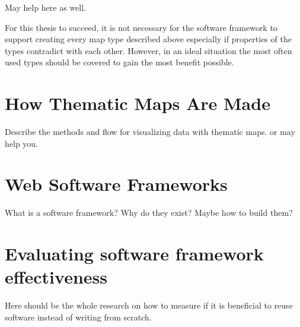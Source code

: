 \citet[p.~16]{tufte_visual_1986} May help here as well.

For this thesis to succeed, it is not necessary for the software framework to support creating every map type described above especially if properties of the types contradict with each other. However, in an ideal situation the most often used types should be covered to gain the most benefit possible. 


\section{How Thematic Maps Are Made}

Describe the methods and flow for visualizing data with thematic maps. \citet{schlichtmann_visualization_2002} or \citet[p.~5]{slocum_thematic_2014} may help you.

\section{Web Software Frameworks}

What is a software framework? Why do they exist? Maybe how to build them?

\section{Evaluating software framework effectiveness}

Here should be the whole research on how to measure if it is beneficial to reuse software instead of writing from scratch.

